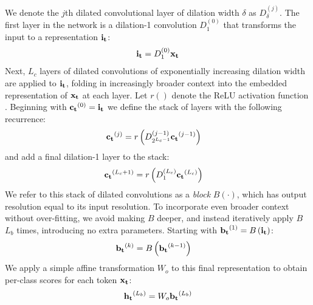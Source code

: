 We denote the $j$th dilated convolutional layer of dilation width $\delta$ as $D_\delta^{(j)}$. The first layer in the network is a dilation-1 convolution $D_1^{(0)}$ that transforms the input to a representation ${\bf i_t}$:
\begin{align}
{\bf i_t} = D_1^{(0)}{\bf x_t}
\end{align}
Next, $L_c$ layers of dilated convolutions of exponentially increasing dilation width are applied to ${\bf i_t}$, folding in increasingly broader context into the embedded representation of ${\bf x_t}$ at each layer. Let $r()$ denote the ReLU activation function \citep{glorot2011deep}. Beginning with ${\bf c_t}^{(0)} = {\bf i_t}$ we define the stack of layers with the following recurrence:
\begin{align}
{\bf c_t}^{(j)} &= r\left(D_{2^{L_c-1}}^{(j-1)}{\bf c_t}^{(j-1)}\right)
\end{align}
and add a final dilation-1 layer to the stack:
\begin{align}
{\bf c_t}^{(L_c+1)} &= r\left(D_1^{(L_c)}{\bf c_t}^{(L_c)}\right)
\end{align}
We refer to this stack of dilated convolutions as a \emph{block} $B(\cdot)$, which has output resolution equal to its input resolution. To incorporate even broader context without over-fitting, we avoid making $B$ deeper, and instead iteratively apply $B$ $L_b$ times, introducing no extra parameters. Starting with ${\bf b_t}^{(1)} = B\left({\bf i_t}\right)$:
\begin{align}
{\bf b_t}^{(k)} &= B\left({\bf b_t}^{(k-1)} \right)
\label{block-eqn}
\end{align}
We apply a simple affine transformation $W_o$ to this final representation to obtain per-class scores for each token ${\bf x_t}$:
\begin{align}
{\bf h_t}^{(L_b)} = W_o{\bf b_t}^{(L_b)}
\label{outputs-eqn}
\end{align}


